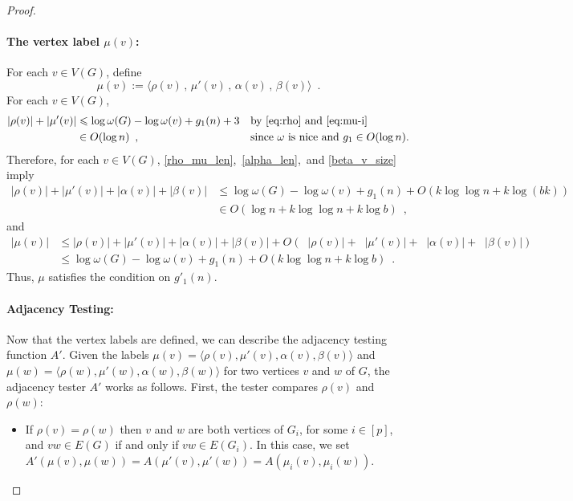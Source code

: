 \documentclass{patmorin}
\let\eqref\cref
\renewcommand{\le}{\leqslant}
\renewcommand{\leq}{\leqslant}
\newcommand{\david}[1]{\noindent{\color{orange} DW: #1}}
\newcommand{\vida}[1]{\noindent{\color{pink} VD: #1}}
\DeclareMathOperator{\lgg}{\hat{lg}}
\newcommand{\Oh}{O}
\begin{document}
\begin{proof}
  \paragraph{\boldmath The vertex label $\mu(v)$:}
  For each $v\in V(G)$, define
  \[
    \mu(v):=
    \langle \rho(v)\,,\, \mu'(v)\,,\, \alpha(v)\,,\, \beta(v) \rangle \enspace .
  \]
  For each $v\in V(G)$,
  \begin{align}
    |\rho(v)|+|\mu'(v)|
     & \le \log\omega(G)-\log\omega(v)+g_1(n)+3 &  & \textrm{by~\eqref{eq:rho} and~\eqref{eq:mu-i}} \label{rho_mu_len} \\
     & \in \Oh(\log n) \enspace ,               &  & \textrm{since $\omega$ is nice and $g_1\in\Oh(\log n)$.}
    \label{rho_mu_len_x}
  \end{align}
  Therefore, for each $v\in V(G)$, \eqref{rho_mu_len},~\eqref{alpha_len},~and \eqref{beta_v_size} imply
  \begin{align*}
    |\rho(v)|+|\mu'(v)| + |\alpha(v)| + |\beta(v)|
     & \leq
    \log\omega(G)-\log\omega(v) + g_1(n) + \Oh(k\log\log n+k\log(bk)) \\
     & \in\Oh(\log n + k\log\log n+k\log b)\enspace,
  \end{align*}
  and
  \begin{align*}
    |\mu(v)|
     & \leq |\rho(v)|+|\mu'(v)| + |\alpha(v)| + |\beta(v)| + \Oh(\lgg|\rho(v)|+\lgg|\mu'(v)| + \lgg|\alpha(v)| + \lgg|\beta(v)|) \\
     & \leq \log\omega(G)-\log\omega(v) + g_1(n) + \Oh(k\log\log n+k\log b) \enspace .
  \end{align*}
  Thus, $\mu$ satisfies the condition on $g'_1(n)$.

  \paragraph{Adjacency Testing:}
  Now that the vertex labels are defined, we can describe the adjacency testing function $A'$.
  Given the labels $\mu(v)=\langle\rho(v),\mu'(v),\alpha(v),\beta(v)\rangle$ and $\mu(w)=\langle\rho(w),\mu'(w),\alpha(w),\beta(w)\rangle$ for two vertices $v$ and $w$ of $G$, the adjacency tester $A'$ works as follows. First, the tester compares $\rho(v)$ and $\rho(w)$:
  \begin{itemize}
    \item If $\rho(v)=\rho(w)$ then $v$ and $w$ are both vertices of $G_i$, for some $i\in[p]$, and $vw\in E(G)$ if and only if $vw\in E(G_i)$.  In this case, we set $A'(\mu(v),\mu(w))=A(\mu'(v),\mu'(w))=A(\mu_i(v),\mu_i(w))$.


\end{itemize}
\end{proof}
\end{document}
